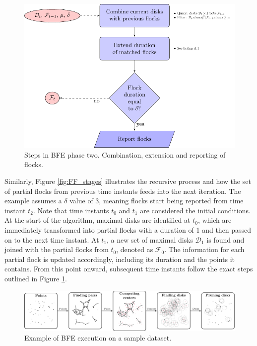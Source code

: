 \begin{figure}
    \centering
    \includegraphics[width=\linewidth]{chapter4/figures/FF_flowchart}
    \caption{Steps in BFE phase two. Combination, extension and reporting of flocks.}\label{fig:FF_flowchart}
\end{figure}

Similarly, Figure \ref{fig:FF_stages} illustrates the recursive process and how the set of partial flocks from previous time instants feeds into the next iteration. The example assumes a $\delta$ value of 3, meaning flocks start being reported from time instant $t_2$. Note that time instants $t_0$ and $t_1$ are considered the initial conditions. At the start of the algorithm, maximal disks are identified at $t_0$, which are immediately transformed into partial flocks with a duration of 1 and then passed on to the next time instant. At $t_1$, a new set of maximal disks $\mathcal{D}_1$ is found and joined with the partial flocks from $t_0$, denoted as $\mathcal{F}_0$. The information for each partial flock is updated accordingly, including its duration and the points it contains. From this point onward, subsequent time instants follow the exact steps outlined in Figure \ref{fig:FF_flowchart}.

\begin{figure}
    \centering
    \includegraphics[width=\linewidth]{chapter4/figures/MF_stages/flow}
    \caption{Example of BFE execution on a sample dataset.}\label{fig:example}
\end{figure}

